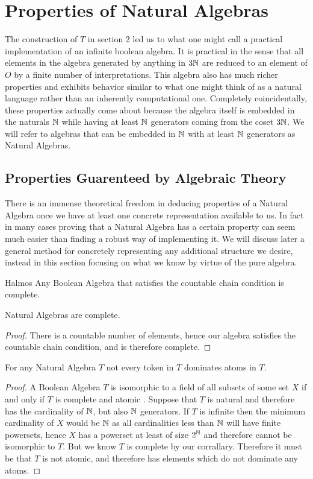 \documentclass[12pt]{amsart}
\begin{document}
\section{Properties of Natural Algebras}
The construction of $T$ in section 2 led us to what one might call a practical implementation of an infinite boolean algebra. It is practical in the sense that all elements in the algebra generated by anything in $3\mathbb{N}$ are reduced to an element of $O$ by a finite number of interpretations. This algebra also has much richer properties and exhibits behavior similar to what one might think of as a natural language rather than an inherently computational one. Completely coincidentally, these properties actually come about because the algebra itself is embedded in the naturals $\mathbb{N}$ while having at least $\mathbb{N}$ generators coming from the coset $3\mathbb{N}$. We will refer to algebras that can be embedded in $\mathbb{N}$ with at least $\mathbb{N}$ generators as Natural Algebras.

\subsection{Properties Guarenteed by Algebraic Theory}
There is an immense theoretical freedom in deducing properties of a Natural Algebra once we have at least one concrete representation available to us. In fact in many cases proving that a Natural Algebra has a certain property can seem much easier than finding a robust way of implementing it. We will discuss later a general method for concretely representing any additional structure we desire, instead in this section focusing on what we know by virtue of the pure algebra.
\begin{lem}Halmos\cite{Halmos2}
Any Boolean Algebra that satisfies the countable chain condition is complete.
\end{lem}
\begin{cor}
 	Natural Algebras are complete.
\end{cor}
\begin{proof}
There is a countable number of elements, hence our algebra satisfies the countable chain condition, and is therefore complete.
\end{proof}


\begin{thm}
For any Natural Algebra $T$ not every token in $T$ dominates atoms in $T$.
\end{thm}
\begin{proof}
A Boolean Algebra $T$ is isomorphic to a field of all subsets of some set $X$ if and only if $T$ is complete and atomic \cite{Halmos2}. Suppose that $T$ is natural and therefore has the cardinality of $\mathbb{N}$, but also $\mathbb{N}$ generators. If $T$ is infinite then the minimum cardinality of $X$ would be $\mathbb{N}$ as all cardinalities less than $\mathbb{N}$ will have finite powersets, hence $X$ has a powerset at least of size $2^{\mathbb{N}}$ and therefore cannot be isomorphic to $T$. But we know $T$ is complete by our corrallary. Therefore it must be that $T$ is not atomic, and therefore has elements which do not dominate any atoms.
\end{proof}
\end{document}
